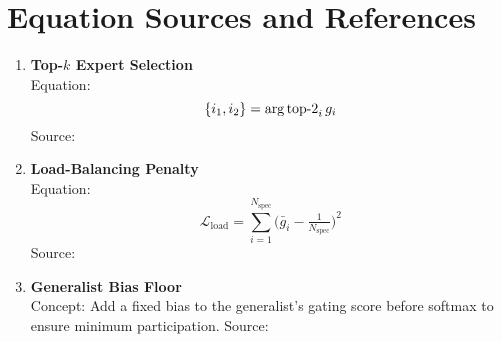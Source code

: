 \section*{Equation Sources and References}
\begin{enumerate}
  \item \textbf{Top-\(k\) Expert Selection}\\
    Equation:
    \begin{equation*}
      \{i_1, i_2\} = \mathrm{arg\,top\text-2}_i\,g_i
    \end{equation*}
    Source: \cite{shazeer2017outrageously}
  
  \item \textbf{Load-Balancing Penalty}\\
    Equation:
    \begin{equation*}
      \mathcal{L}_{\text{load}} = \sum_{i=1}^{N_{\text{spec}}} \bigl(\bar{g}_i - \tfrac{1}{N_{\text{spec}}}\bigr)^2
    \end{equation*}
    Source: \cite{shazeer2017loadbalancing}
  
  \item \textbf{Generalist Bias Floor}\\
    Concept: Add a fixed bias to the generalist’s gating score before softmax to ensure minimum participation.
    Source: \cite{shazeer2017outrageously}
\end{enumerate}

